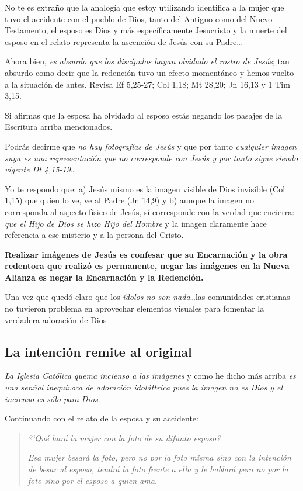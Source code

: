 \documentclass{article}
\begin{document}
No te es extra\~no que la analog\'{i}a que estoy utilizando identifica a la mujer que tuvo el accidente con el pueblo de Dios, tanto del Antiguo como del Nuevo Testamento, el esposo es Dios y m\'as espec\'{i}ficamente Jesucristo y la muerte del esposo en el relato representa la ascenci\'on de Jes\'us con su Padre\ldots

Ahora bien, \emph{es absurdo que los disc\'{i}pulos hayan olvidado el rostro de Jes\'us}; tan absurdo como decir que la redenci\'on tuvo un efecto moment\'aneo y hemos vuelto a la situaci\'on de antes. Revisa Ef 5,25-27; Col 1,18; Mt 28,20; Jn 16,13 y 1 Tim 3,15.

Si afirmas que la esposa ha olvidado al esposo est\'as negando los pasajes de la Escritura arriba mencionados.

Podr\'as decirme que \emph{no hay fotograf\'{i}as de Jes\'us} y que por tanto \emph{cualquier imagen suya es una representaci\'on que no corresponde con Jes\'us y por tanto sigue siendo vigente Dt 4,15-19}\ldots 

Yo te respondo que: a) Jes\'us mismo es la imagen visible de Dios invisible (Col 1,15) que quien lo ve, ve al Padre (Jn 14,9) y b) aunque la imagen no corresponda al aspecto f\'{i}sico de Jes\'us, s\'{i} corresponde con la verdad que encierra: \emph{que el Hijo de Dios se hizo Hijo del Hombre} y la imagen claramente hace referencia a ese misterio y a la persona del Cristo.

\textbf{Realizar im\'agenes de Jes\'us es confesar que su Encarnaci\'on y la obra redentora que realiz\'o es permanente, negar las im\'agenes en la Nueva Alianza es negar la Encarnaci\'on y la Redenci\'on.}

Una vez que qued\'o claro que los \emph{\'{i}dolos no son nada}\ldots las comunidades cristianas no tuvieron problema en aprovechar elementos visuales para fomentar la verdadera adoraci\'on de Dios

\subsection{La intenci\'on remite al original}

\emph{La Iglesia Cat\'olica quema incienso a las im\'agenes} y como he dicho m\'as arriba \emph{es una sen\~nal inequ\'ivoca de adoraci\'on idol\'attrica pues la imagen no es Dios y el incienso es s\'olo para Dios}.

Continuando con el relato de la esposa y su accidente:

\begin{quote}
\emph{?`Qu\'e har\'a la mujer con la foto de su difunto esposo?}

\emph{Esa mujer besar\'a la foto, pero no por la foto misma sino con la intenci\'on de besar al esposo, tendr\'a la foto frente a ella y le hablar\'a pero no por la foto sino por el esposo a quien ama.}
\end{quote}
\end{document}
